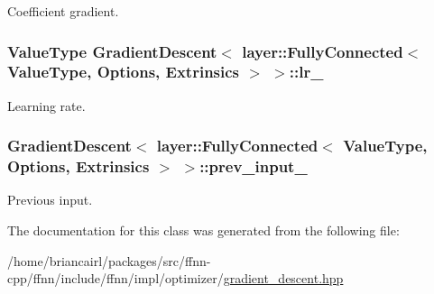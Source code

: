 Coefficient gradient. 

\hypertarget{class_gradient_descent_3_01layer_1_1_fully_connected_3_01_value_type_00_01_options_00_01_extrinsics_01_4_01_4_a8d9026efb5e5d408ad24d0176563dd96}{
\subsubsection[{lr\-\_\-}]{\setlength{\rightskip}{0pt plus 5cm}Value\-Type {\bf Gradient\-Descent}$<$ layer\-::\-Fully\-Connected$<$ Value\-Type, Options, Extrinsics $>$ $>$\-::lr\-\_\-\hspace{0.3cm}{\ttfamily [protected]}}}\label{class_gradient_descent_3_01layer_1_1_fully_connected_3_01_value_type_00_01_options_00_01_extrinsics_01_4_01_4_a8d9026efb5e5d408ad24d0176563dd96}


Learning rate. 

\hypertarget{class_gradient_descent_3_01layer_1_1_fully_connected_3_01_value_type_00_01_options_00_01_extrinsics_01_4_01_4_a7c037c4374ffc88f67aa8a7ea95d5703}{
\subsubsection[{prev\-\_\-input\-\_\-}]{ {\bf Gradient\-Descent}$<$ layer\-::\-Fully\-Connected$<$ Value\-Type, Options, Extrinsics $>$ $>$\-::prev\-\_\-input\-\_\-\hspace{0.3cm}{\ttfamily [protected]}}}\label{class_gradient_descent_3_01layer_1_1_fully_connected_3_01_value_type_00_01_options_00_01_extrinsics_01_4_01_4_a7c037c4374ffc88f67aa8a7ea95d5703}


Previous input. 



The documentation for this class was generated from the following file\-:\begin{DoxyCompactItemize}
\item 
/home/briancairl/packages/src/ffnn-\/cpp/ffnn/include/ffnn/impl/optimizer/\hyperlink{gradient__descent_8hpp}{gradient\-\_\-descent.\-hpp}\end{DoxyCompactItemize}
